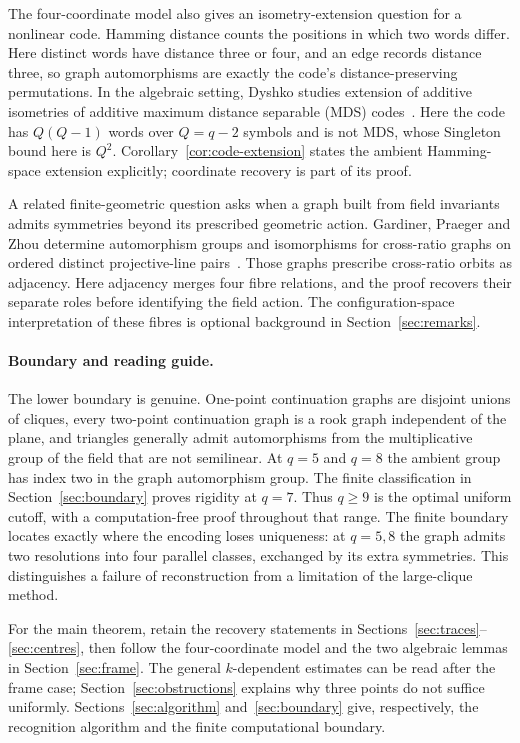 \documentclass[11pt]{article}
\theoremstyle{definition}
\theoremstyle{remark}
\begin{document}
The four-coordinate model also gives an isometry-extension question for
a nonlinear code. Hamming distance counts the positions in which two
words differ. Here distinct words have distance three or four, and an
edge records distance three, so graph automorphisms are exactly the
code's distance-preserving permutations. In the algebraic setting,
Dyshko studies extension of additive isometries of additive maximum
distance separable (MDS) codes~\cite[Sections 1--2]{Dyshko}. Here the
code has $Q(Q-1)$ words over $Q=q-2$ symbols and is not MDS, whose
Singleton bound here is $Q^2$. Corollary~\ref{cor:code-extension} states
the ambient Hamming-space extension explicitly; coordinate recovery is
part of its proof.

A related finite-geometric question asks when a graph built from field
invariants admits symmetries beyond its prescribed geometric action.
Gardiner, Praeger and Zhou determine automorphism groups and isomorphisms
for cross-ratio graphs on ordered distinct projective-line
pairs~\cite[Theorems 7.1--7.2]{GPZ}. Those graphs prescribe cross-ratio
orbits as adjacency. Here adjacency merges four fibre relations, and the
proof recovers their separate roles before identifying the field action.
The configuration-space interpretation of these fibres is optional
background in Section~\ref{sec:remarks}.

\paragraph{Boundary and reading guide.}
The lower boundary is genuine.  One-point continuation graphs are disjoint
unions of cliques, every two-point continuation graph is a rook graph
independent of the plane, and triangles generally admit automorphisms from
the multiplicative group of the field that are not semilinear.  At $q=5$ and $q=8$ the ambient group has index two in the graph
automorphism group. The finite classification in
Section~\ref{sec:boundary} proves rigidity at $q=7$.
Thus $q\ge9$ is the optimal uniform cutoff, with a computation-free
proof throughout that range. The finite
boundary locates exactly where the encoding loses uniqueness: at $q=5,8$
the graph admits two resolutions into four parallel classes, exchanged by its extra
symmetries. This distinguishes a failure of reconstruction from a
limitation of the large-clique method.

For the main theorem, retain the recovery statements in
Sections~\ref{sec:traces}--\ref{sec:centres}, then follow the four-coordinate
model and the two algebraic lemmas in Section~\ref{sec:frame}.
The general $k$-dependent estimates can be read after the frame case;
Section~\ref{sec:obstructions} explains why three points do not suffice
uniformly.
Sections~\ref{sec:algorithm} and~\ref{sec:boundary} give, respectively,
the recognition algorithm and the finite computational boundary.
\end{document}

